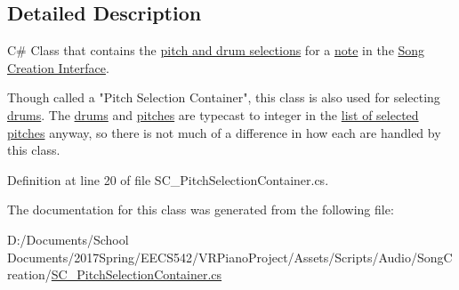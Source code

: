 \subsection{Detailed Description}
C\# Class that contains the \hyperlink{group___doc_s_c___p_s_t}{pitch and drum selections} for a \hyperlink{group___music_structs_struct_music_1_1_combined_note}{note} in the \hyperlink{group___doc_s_c}{Song Creation Interface}. 

Though called a "Pitch Selection Container", this class is also used for selecting \hyperlink{group___music_enums_gade475b4382c7066d1af13e7c13c029b6}{drums}. The \hyperlink{group___music_enums_gade475b4382c7066d1af13e7c13c029b6}{drums} and \hyperlink{group___music_enums_ga508f69b199ea518f935486c990edac1d}{pitches} are typecast to integer in the \hyperlink{group___s_c___p_s_c_priv_var_ga5a8a5c31158f6af7f0c17d4fd03c5641}{list of selected pitches} anyway, so there is not much of a difference in how each are handled by this class. 

Definition at line 20 of file S\+C\+\_\+\+Pitch\+Selection\+Container.\+cs.



The documentation for this class was generated from the following file\+:\begin{DoxyCompactItemize}
\item 
D\+:/\+Documents/\+School Documents/2017\+Spring/\+E\+E\+C\+S542/\+V\+R\+Piano\+Project/\+Assets/\+Scripts/\+Audio/\+Song\+Creation/\hyperlink{_s_c___pitch_selection_container_8cs}{S\+C\+\_\+\+Pitch\+Selection\+Container.\+cs}\end{DoxyCompactItemize}
